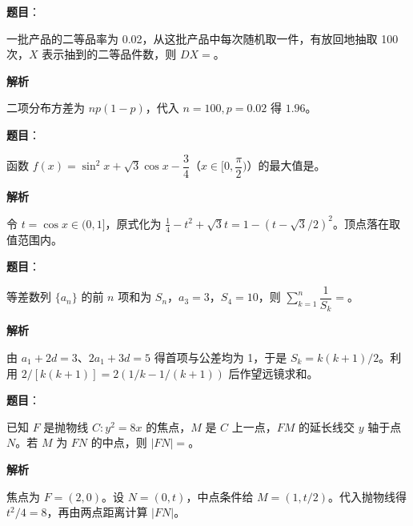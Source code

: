\begin{answer}

\textbf{题目}：

一批产品的二等品率为 0.02，从这批产品中每次随机取一件，有放回地抽取 100 次，\(X\) 表示抽到的二等品件数，则 \(DX=\)\gkblank{}。

\textbf{解析}

二项分布方差为 \(np(1-p)\)，代入 \(n=100,p=0.02\) 得 \(1.96\)。


\end{answer}
\begin{answer}

\textbf{题目}：

函数 \(f(x)=\sin^2x+\sqrt{3}\cos x-\dfrac{3}{4}\)（\(x\in[0,\dfrac{\pi}{2})\)）的最大值是\gkblank{}。

\textbf{解析}

令 \(t=\cos x\in(0,1]\)，原式化为 \(\frac14-t^2+\sqrt3t=1-(t-\sqrt3/2)^2\)。顶点落在取值范围内。


\end{answer}
\begin{answer}

\textbf{题目}：

等差数列 \(\{a_n\}\) 的前 \(n\) 项和为 \(S_n\)，\(a_3=3\)，\(S_4=10\)，则 \(\displaystyle\sum_{k=1}^{n}\dfrac{1}{S_k}=\)\gkblank{}。

\textbf{解析}

由 \(a_1+2d=3\)、\(2a_1+3d=5\) 得首项与公差均为 1，于是 \(S_k=k(k+1)/2\)。利用 \(2/[k(k+1)]=2(1/k-1/(k+1))\) 后作望远镜求和。


\end{answer}
\begin{answer}

\textbf{题目}：

已知 \(F\) 是抛物线 \(C:y^2=8x\) 的焦点，\(M\) 是 \(C\) 上一点，\(FM\) 的延长线交 \(y\) 轴于点 \(N\)。若 \(M\) 为 \(FN\) 的中点，则 \(|FN|=\)\gkblank{}。

\textbf{解析}

焦点为 \(F=(2,0)\)。设 \(N=(0,t)\)，中点条件给 \(M=(1,t/2)\)。代入抛物线得 \(t^2/4=8\)，再由两点距离计算 \(|FN|\)。


\end{answer}
